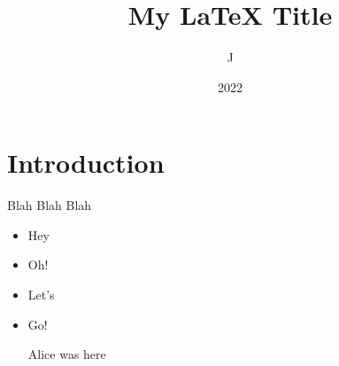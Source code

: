 \documentclass[12pt]{article}
\title{My LaTeX Title}
\author{J}
\date{2022}
\begin{document}
\maketitle

\section{Introduction}

Blah Blah Blah

\begin{itemize}

\item Hey

\item Oh!

\item Let’s

\item Go!

Alice was here

\end{itemize}
\end{document}
